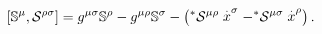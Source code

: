 \begin{equation}
\left[ \Bbb{S}^{\mu },\mathcal{S}^{\rho \sigma }\right] =g^{\mu \sigma }\Bbb{%
S}^{\rho }-g^{\mu \rho }\Bbb{S}^{\sigma }-\left( ^{*}\mathcal{S}^{\mu \rho }%
\stackrel{.}{x}^{\sigma }-^{*}\mathcal{S}^{\mu \sigma }\stackrel{.}{x}^{\rho
}\right) .  \label{[S,S]}
\end{equation}


